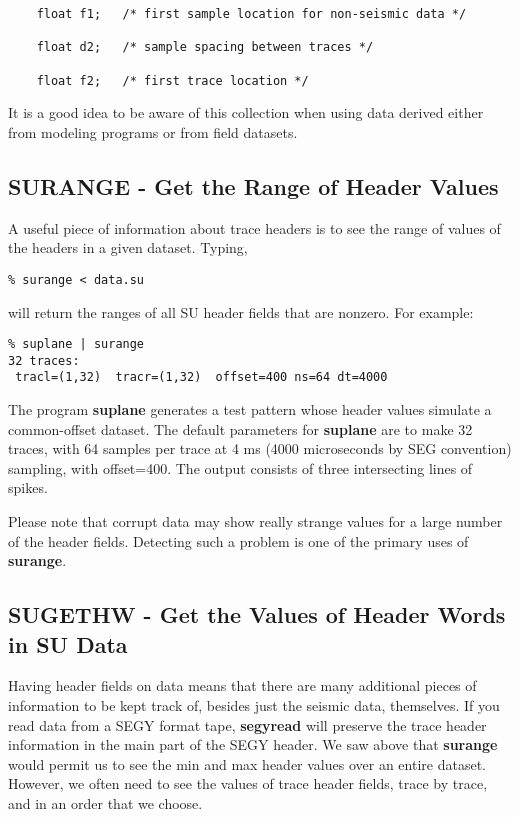 {{{{\begin{verbatim}
	float f1;	/* first sample location for non-seismic data */

	float d2;	/* sample spacing between traces */

	float f2;	/* first trace location */
\end{verbatim}}\noindent
It is a good idea to be aware of this collection when using
data derived either from modeling programs or from field datasets.

\subsection{SURANGE - Get the Range of Header Values}

A useful piece of information about trace headers is to see
the range of values of the headers in a given dataset.
Typing, 
{\small\begin{verbatim}
% surange < data.su
\end{verbatim}}\noindent
will return the ranges of all SU header fields that are nonzero.
For example:
{\small\begin{verbatim}
% suplane | surange
32 traces:
 tracl=(1,32)  tracr=(1,32)  offset=400 ns=64 dt=4000
\end{verbatim}}\noindent
The program {\bf suplane\/} generates a test pattern whose header
values simulate a common-offset dataset. The default parameters for
{\bf suplane\/} are to make 32 traces, with 64 samples per trace
at 4 ms (4000 microseconds by SEG convention) sampling, with
offset=400. The output consists of three intersecting lines
of spikes.

Please note that corrupt data may show really strange values for
a large number of the header fields. Detecting such a problem
is one of the primary uses of {\bf surange}.

\subsection{SUGETHW - Get the Values of Header Words in SU Data}

Having header fields on data means that there are many additional
pieces of information to be kept track of, besides just the seismic
data, themselves. 
If you read data from a SEGY format tape, {\bf segyread\/} will
preserve the trace header information in the main part of the
SEGY header.
We saw above that {\bf surange\/} would permit us to see the min
and max header values over an entire dataset.
However, we often need to see the values of trace header
fields, trace by trace, and in an order that we choose.

}}}
